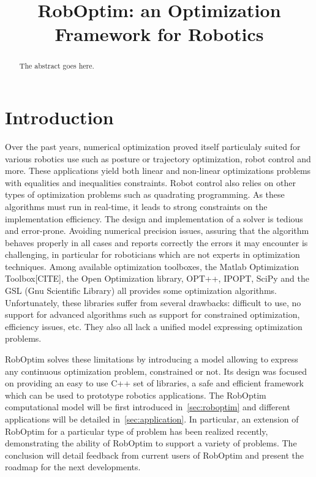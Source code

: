 \documentclass[conference,final,a4paper,twocolumn,9pt]{IEEEtran}
\begin{document}
\title{RobOptim: an Optimization Framework for Robotics}

\author{
\and
{}
\and
{}
\and
{}
}

\maketitle

\begin{abstract}
\boldmath
The abstract goes here.
\end{abstract}

\IEEEpeerreviewmaketitle

\section{Introduction}\label{sec:introduction}


Over the past years, numerical optimization proved itself particulaly
suited for various robotics use such as posture or trajectory
optimization, robot control and more. These applications yield both
linear and non-linear optimizations problems with equalities and
inequalities constraints. Robot control also relies on other types of
optimization problems such as quadrating programming. As these
algorithms must run in real-time, it leads to strong constraints on
the implementation efficiency. The design and implementation of a
solver is tedious and error-prone. Avoiding numerical precision
issues, assuring that the algorithm behaves properly in all cases and
reports correctly the errors it may encounter is challenging, in
particular for roboticians which are not experts in optimization
techniques. Among available optimization toolboxes, the Matlab
Optimization Toolbox[CITE], the Open Optimization library, OPT++,
IPOPT, SciPy and the GSL (Gnu Scientific Library) all provides some
optimization algorithms. Unfortunately, these libraries suffer from
several drawbacks: difficult to use, no support for advanced
algorithms such as support for constrained optimization, efficiency
issues, etc. They also all lack a unified model expressing
optimization problems.


RobOptim solves these limitations by introducing a model allowing to
express any continuous optimization problem, constrained or not. Its
design was focused on providing an easy to use C++ set of libraries, a
safe and efficient framework which can be used to prototype robotics
applications. The RobOptim computational model will be first
introduced in~\autoref{sec:roboptim} and different applications will
be detailed in~\autoref{sec:application}. In particular, an extension
of RobOptim for a particular type of problem has been realized
recently, demonstrating the ability of RobOptim to support a variety
of problems. The conclusion will detail feedback from current users of
RobOptim and present the roadmap for the next developments.
\end{document}
